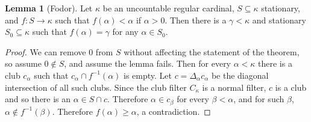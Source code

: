\documentclass[12pt]{report}
\theoremstyle{definition}
\newtheorem{lemma}[theorem]{Lemma}
\begin{document}
\begin{lemma}[Fodor]
Let $\kappa$ be an uncountable regular cardinal, $S \subseteq \kappa$ stationary, and $f: S \to \kappa$ such that $f(\alpha) < \alpha$ if $\alpha > 0$.
Then there is a $\gamma < \kappa$ and stationary $S_0 \subseteq \kappa$ such that $f(\alpha) = \gamma$ for any $\alpha \in S_0$.
\end{lemma}
\begin{proof}
We can remove $0$ from $S$ without affecting the statement of the theorem, so assume $0 \notin S$, and assume the lemma fails.
Then for every $\alpha < \kappa$ there is a club $c_\alpha$ such that $c_\alpha \cap f^{-1}(\alpha)$ is empty.
Let $c = \Delta_\alpha c_\alpha$ be the diagonal intersection of all such clubs.
Since the club filter $C_\kappa$ is a normal filter, $c$ is a club and so there is an $\alpha \in S \cap c$.
Therefore $\alpha \in c_\beta$ for every $\beta < \alpha$, and for such $\beta$, $\alpha \notin f^{-1}(\beta)$.
Therefore $f(\alpha) \geq \alpha$, a contradiction.
\end{proof}
\end{document}
